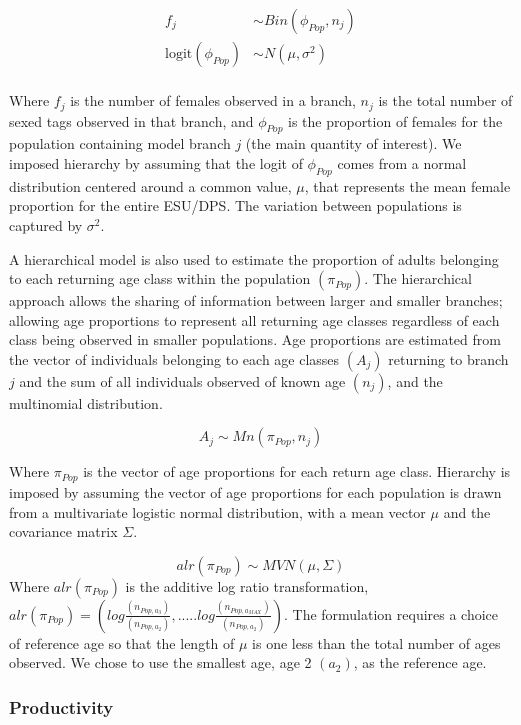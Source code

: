 \documentclass[]{article}
\begin{document}
\[
\begin{aligned}
f_j &\sim Bin(\phi_{Pop}, n_j) \\
\text{logit}(\phi_{Pop}) &\sim N(\mu, \sigma^2) \\
\end{aligned}
\]

Where \(f_j\) is the number of females observed in a branch, \(n_j\) is
the total number of sexed tags observed in that branch, and
\(\phi_{Pop}\) is the proportion of females for the population
containing model branch \(j\) (the main quantity of interest). We
imposed hierarchy by assuming that the logit of \(\phi_{Pop}\) comes
from a normal distribution centered around a common value, \(\mu\), that
represents the mean female proportion for the entire ESU/DPS. The
variation between populations is captured by \(\sigma^2\).

A hierarchical model is also used to estimate the proportion of adults
belonging to each returning age class within the population
\((\pi_{Pop})\). The hierarchical approach allows the sharing of
information between larger and smaller branches; allowing age
proportions to represent all returning age classes regardless of each
class being observed in smaller populations. Age proportions are
estimated from the vector of individuals belonging to each age classes
\((A_j)\) returning to branch \(j\) and the sum of all individuals
observed of known age \((n_j)\), and the multinomial distribution.

\[
A_j \sim Mn(\pi_{Pop}, n_j)
\]

Where \(\pi_{Pop}\) is the vector of age proportions for each return age
class. Hierarchy is imposed by assuming the vector of age proportions
for each population is drawn from a multivariate logistic normal
distribution, with a mean vector \(\mu\) and the covariance matrix
\(\Sigma\).

\[
alr(\pi_{Pop}) \sim MVN(\mu, \Sigma)
\] Where \(alr(\pi_{Pop})\) is the additive log ratio transformation,
\(alr(\pi_{Pop}) = (log\frac{(n_{Pop,a_3})}{(n_{Pop,a_2})},.....log\frac{(n_{Pop,a_{MAX}})}{(n_{Pop,a_2})})\).
The formulation requires a choice of reference age so that the length of
\(\mu\) is one less than the total number of ages observed. We chose to
use the smallest age, age 2 \((a_2)\), as the reference age.

\hypertarget{productivity}{%
\subsubsection{Productivity}\label{productivity}}
\end{document}
